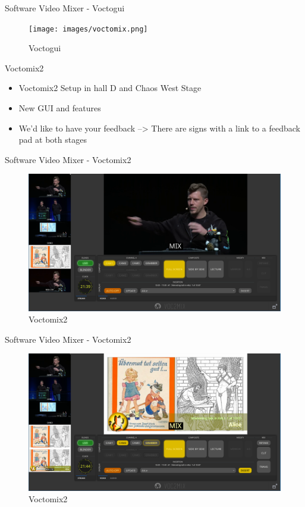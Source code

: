 \documentclass[aspectratio=169]{beamer}
\begin{document}
\begin{frame}{Software Video Mixer - Voctogui}
	\begin{figure} 
		\centering
		\texttt{[image: images/voctomix.png]}
		\caption{Voctogui}
	\end{figure}
\end{frame}

\begin{frame}{Voctomix2}%
	\begin{itemize}
		\item Voctomix2 Setup in hall D and Chaos West Stage
		\item New GUI and features
		\item We'd like to have your feedback --> There are signs with a link to a feedback pad at both stages 
	\end{itemize}
\end{frame}

\begin{frame}{Software Video Mixer - Voctomix2}%
	\begin{figure} 
		\centering
		\includegraphics[width=.9\textwidth]{images/voctomix2_1.png}%
		\caption{Voctomix2}
	\end{figure}
\end{frame}

\begin{frame}{Software Video Mixer - Voctomix2}%
	\begin{figure} 
		\centering
		\includegraphics[width=.9\textwidth]{images/voctomix2_2.png}%
		\caption{Voctomix2}
	\end{figure}
\end{frame}
\end{document}

